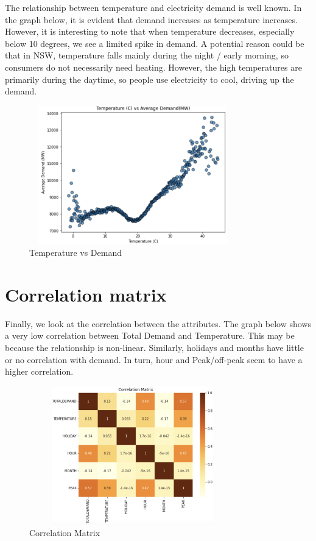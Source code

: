 \documentclass[mstat,12pt]{unswthesis}
\begin{document}
The relationship between temperature and electricity demand is well
known. In the graph below, it is evident that demand increases as
temperature increases. However, it is interesting to note that when
temperature decreases, especially below 10 degrees, we see a limited
spike in demand. A potential reason could be that in NSW, temperature
falls mainly during the night / early morning, so consumers do not
necessarily need heating. However, the high temperatures are primarily
during the daytime, so people use electricity to cool, driving up the
demand.

\begin{figure}[H]
\centering
\includegraphics[width=0.80\textwidth,height=6cm]{temperature_demand.png}
\caption{Temperature vs Demand}
\label{temperature_demand}
\end{figure}

\hypertarget{correlation-matrix}{%
\section{Correlation matrix}\label{correlation-matrix}}

Finally, we look at the correlation between the attributes. The graph
below shows a very low correlation between Total Demand and Temperature.
This may be because the relationship is non-linear. Similarly, holidays
and months have little or no correlation with demand. In turn, hour and
Peak/off-peak seem to have a higher correlation.

\begin{figure}[H]
\centering
\includegraphics[width=0.80\textwidth,height=6cm]{correlation_matrix.png}
\caption{Correlation Matrix}
\label{correlation_matrix}
\end{figure}
\end{document}
